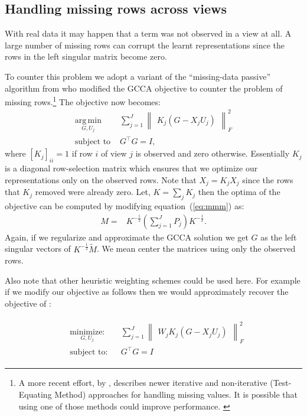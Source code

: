 \documentclass[11pt]{article}
\newcommand{\minimize}[3]{
\begin{aligned}
& \underset{#1}{\textrm{minimize:}}
& & #2 \\
& \textrm{subject to:}
& &  #3
\end{aligned}
}
\newcommand{\remove}[1]{}
\begin{document}
\subsection{Handling missing rows across views}
\label{ssec:missing}
With real data it may happen that a term was not observed in a view at
all. A large number of 
missing rows can corrupt the learnt representations since the rows
in the left singular matrix become zero.
\remove{The procedure described above
can not recover from this and the representation for those words may become a
one hot vector. }
To counter this problem we adopt a variant of the ``missing-data
passive'' algorithm from  who modified the
GCCA objective to counter the problem of missing 
rows.\footnote{A more recent effort, by ,
  describes newer iterative and non-iterative (Test-Equating Method)
  approaches for handling missing values. It is possible that using
  one of those methods could improve performance. \label{ftn:mis}}
The objective now becomes:
\begin{equation}
  \label{eq:gcca2}
\begin{split}
  \operatorname*{arg\,min}_{G,U_j} & \sum_{j=1}^J \begin{Vmatrix} K_j(G - X_jU_j) \end{Vmatrix}^2_F \\
  \text{subject to } & G^\top G = I, 
\end{split}
\end{equation}
where $[K_j]_{ii} = 1$ if row $i$ of view $j$ is observed and zero otherwise. Essentially $K_j$ is a diagonal row-selection matrix which ensures
that we optimize our representations only on the observed rows. Note that
$X_j = K_jX_j$ since the rows that $K_j$ removed were already
zero. Let, $K =
\sum_j K_j$ then the optima
of the objective can be computed by modifying equation~(\ref{eq:mmm}) as:
\begin{align}
  M =& K^{-\frac{1}{2}}(\sum_{j=1}^J P_j)K^{-\frac{1}{2}}.
\end{align}
Again, if we regularize and approximate the GCCA solution we get
$G$ as the left singular vectors of $K^{-\frac{1}{2}}\tilde{M}$. We mean center the matrices using only the observed rows.

Also note that other heuristic weighting schemes could be used
here. For example if we modify our objective as follows then we would
approximately recover the objective of :

\begin{eqnarray}
  \label{eq:gcca3}
\minimize{G,U_j}{\sum_{j=1}^J \begin{Vmatrix} W_j K_j(G - X_jU_j) \end{Vmatrix}^2_F}{G^\top G = I }
\end{eqnarray}
\end{document}
